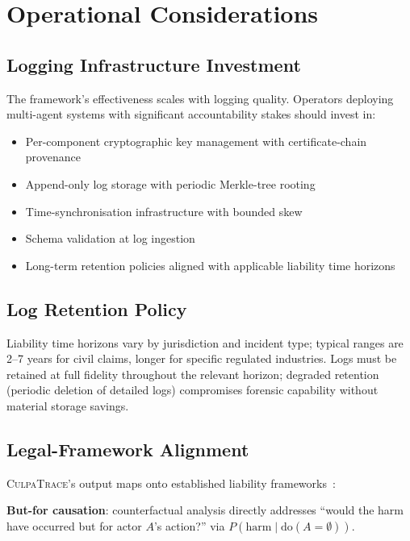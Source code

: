 \documentclass[sigconf,nonacm]{acmart}
\begin{document}
\section{Operational Considerations}

\subsection{Logging Infrastructure Investment}

The framework's effectiveness scales with logging quality.
Operators deploying multi-agent systems with significant
accountability stakes should invest in:

\begin{itemize}
  \item Per-component cryptographic key management with
        certificate-chain provenance
  \item Append-only log storage with periodic Merkle-tree
        rooting
  \item Time-synchronisation infrastructure with bounded skew
  \item Schema validation at log ingestion
  \item Long-term retention policies aligned with applicable
        liability time horizons
\end{itemize}

\subsection{Log Retention Policy}

Liability time horizons vary by jurisdiction and incident type;
typical ranges are 2--7 years for civil claims, longer for
specific regulated industries. Logs must be retained at full
fidelity throughout the relevant horizon; degraded retention
(periodic deletion of detailed logs) compromises forensic
capability without material storage savings.

\subsection{Legal-Framework Alignment}

\textsc{CulpaTrace}'s output maps onto established liability
frameworks~\cite{chen2024ailiability}:

\textbf{But-for causation}: counterfactual analysis directly
addresses ``would the harm have occurred but for actor $A$'s
action?'' via $P(\text{harm} \mid \text{do}(A = \emptyset))$.
\end{document}
